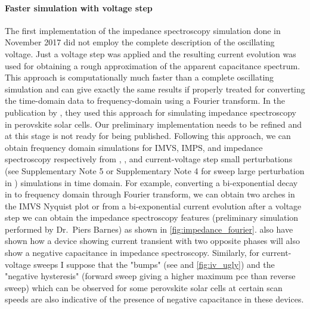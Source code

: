 \paragraph{Faster simulation with voltage step}\label{impedance_fourier}
The first implementation of the impedance spectroscopy simulation done in November 2017 did not employ the complete description of the oscillating voltage.
Just a voltage step was applied and the resulting current evolution was used for obtaining a rough approximation of the apparent capacitance spectrum.
This approach is computationally much faster than a complete oscillating simulation and can give exactly the same results if properly treated for converting the time\hyp{}domain data to frequency\hyp{}domain using a Fourier transform.
In the publication by , they used this approach for simulating impedance spectroscopy in perovskite solar cells.
Our preliminary implementation needs to be refined and at this stage is not ready for being published.
Following this approach, we can obtain frequency domain simulations for IMVS, IMPS, and impedance spectroscopy respectively from , , and current\hyp{}voltage step small perturbations (see Supplementary Note 5 or Supplementary Note 4 for sweep large perturbation in ) simulations in time domain.
For example, converting a bi\hyp{}exponential decay in  to frequency domain through Fourier transform, we can obtain two arches in the IMVS Nyquist plot or from a bi\hyp{}exponential current evolution after a voltage step we can obtain the impedance spectroscopy features (preliminary simulation performed by Dr.\ Piers Barnes) as shown in \cref{fig:impedance_fourier}.
 also have shown how a device showing current transient with two opposite phases will also show a negative capacitance in impedance spectroscopy.
Similarly, for current\hyp{}voltage sweeps I suppose that the "bumps" (see  and \cref{fig:iv_ugly}) and the "negative hysteresis" (forward sweep giving a higher maximum \gls{pce} than reverse sweep) which can be observed for some perovskite solar cells at certain scan speeds are also indicative of the presence of negative capacitance in these devices.

